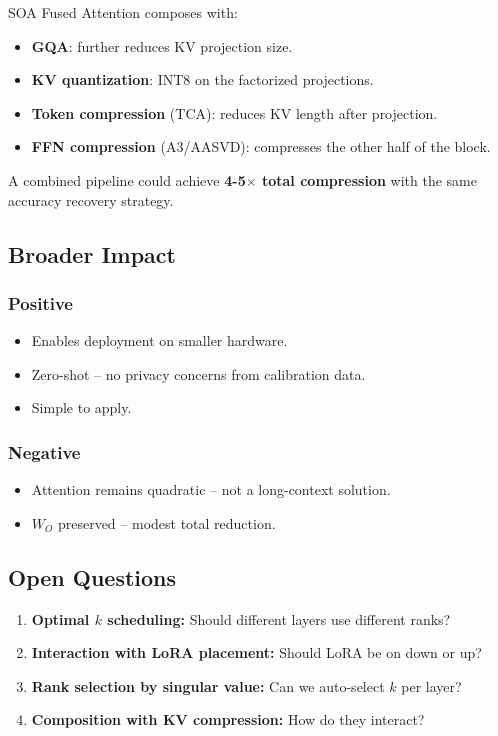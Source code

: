 SOA Fused Attention composes with:

\begin{itemize}
\item \textbf{GQA}: further reduces KV projection size.
\item \textbf{KV quantization}: INT8 on the factorized projections.
\item \textbf{Token compression} (TCA): reduces KV length after projection.
\item \textbf{FFN compression} (A3/AASVD): compresses the other half of the block.

\end{itemize}
A combined pipeline could achieve \textbf{4-5$\times$ total compression} with the same 
accuracy recovery strategy.

\subsection{Broader Impact}

\subsubsection{Positive}
\begin{itemize}
\item Enables deployment on smaller hardware.
\item Zero-shot -- no privacy concerns from calibration data.
\item Simple to apply.

\end{itemize}
\subsubsection{Negative}
\begin{itemize}
\item Attention remains quadratic -- not a long-context solution.
\item $W_O$ preserved -- modest total reduction.

\end{itemize}
\subsection{Open Questions}

\begin{enumerate}
\item \textbf{Optimal $k$ scheduling:} Should different layers use different ranks?
\item \textbf{Interaction with LoRA placement:} Should LoRA be on down or up?
\item \textbf{Rank selection by singular value:} Can we auto-select $k$ per layer?
\item \textbf{Composition with KV compression:} How do they interact?

\end{enumerate}



